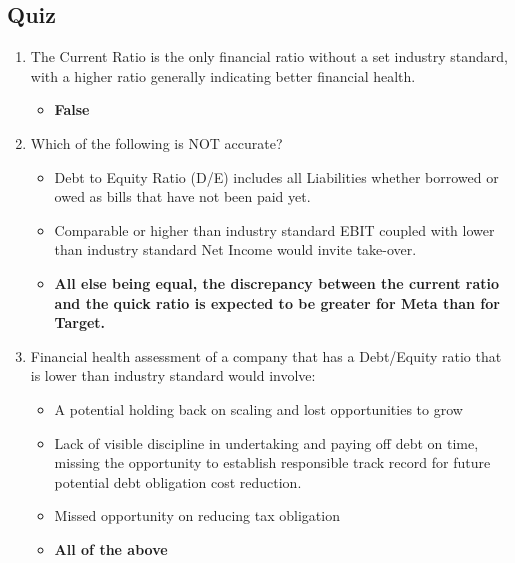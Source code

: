 \begin{tiny}
  \subsection{Quiz}
  \begin{enumerate}[itemsep=-0.5em]
    \item The Current Ratio is the only financial ratio without a set industry standard, with a higher ratio generally indicating better financial health.
          \begin{itemize}[itemsep=-0.2em]
            \item \textbf{False}
          \end{itemize}
    \item Which of the following is NOT accurate?
          \begin{itemize}[itemsep=-0.2em]
            \item Debt to Equity Ratio (D/E) includes all Liabilities whether borrowed or owed as bills that have not been paid yet.
            \item Comparable or higher than industry standard EBIT coupled with lower than industry standard Net Income would invite take-over.
            \item \textbf{All else being equal, the discrepancy between the current ratio and the quick ratio is expected to be greater for Meta than for Target.}
          \end{itemize}
    \item Financial health assessment of a company that has a Debt/Equity ratio that is lower than industry standard would involve:
          \begin{itemize}[itemsep=-0.2em]
            \item A potential holding back on scaling and lost opportunities to grow
            \item Lack of visible discipline in undertaking and paying off debt on time, missing the opportunity to establish responsible track record for future potential debt obligation cost reduction.
            \item Missed opportunity on reducing tax obligation
            \item \textbf{All of the above}
          \end{itemize}
  \end{enumerate}

\end{tiny}
